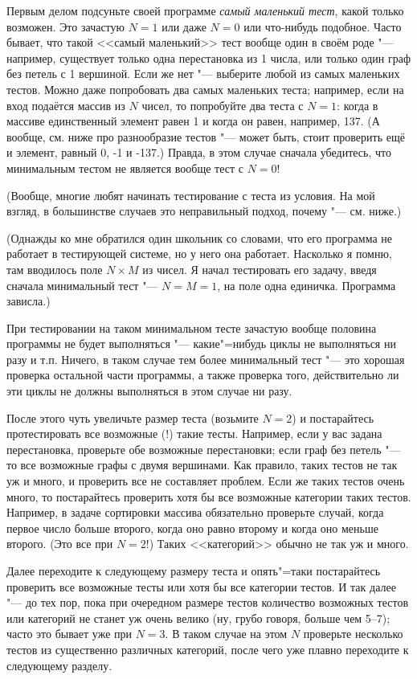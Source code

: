 \documentclass[a4paper,10pt]{problems}
\begin{document}
Первым делом подсуньте своей программе \textit{самый маленький тест}, какой только возможен. Это зачастую $N=1$ или даже $N=0$ или что-нибудь подобное. Часто бывает, что такой <<самый маленький>> тест вообще один в своём роде "--- например, существует только одна перестановка из 1 числа, или только один граф без петель с 1 вершиной. Если же нет "--- выберите любой из самых маленьких тестов. Можно даже попробовать два самых маленьких теста; например, если на вход подаётся массив из $N$ чисел, то попробуйте два теста с $N=1$: когда в массиве единственный элемент равен 1 и когда он равен, например, 137. (А вообще, см. ниже про разнообразие тестов "--- может быть, стоит проверить ещё и элемент, равный 0, -1 и -137.) Правда, в этом случае сначала убедитесь, что минимальным тестом не является вообще тест с $N=0$!

(Вообще, многие любят начинать тестирование с теста из условия. На мой взгляд, в большинстве случаев это неправильный подход, почему "--- см. ниже.)

(Однажды ко мне обратился один школьник со словами, что его программа не работает в тестирующей системе, но у него она работает.
Насколько я помню, там вводилось поле $N\times M$ из чисел. 
Я начал тестировать его задачу, введя сначала минимальный тест "--- $N=M=1$, на поле одна единичка. 
Программа зависла.)

При тестировании на таком минимальном тесте зачастую вообще половина программы не будет выполняться "--- какие"=нибудь циклы не выполняться ни разу и т.п.
Ничего, в таком случае тем более минимальный тест "--- это хорошая проверка остальной части программы,
а также проверка того, действительно ли эти циклы не должны выполняться в этом случае ни разу.

После этого чуть увеличьте размер теста (возьмите $N=2$) и постарайтесь протестировать все возможные (!) такие тесты. 
Например, если у вас задана перестановка, проверьте обе возможные перестановки; если граф без петель "--- то все возможные графы с двумя вершинами. 
Как правило, таких тестов не так уж и много, и проверить все не составляет проблем. 
Если же таких тестов очень много, то постарайтесь проверить хотя бы все возможные категории таких тестов. 
Например, в задаче сортировки массива обязательно проверьте случай, когда первое число больше второго, когда оно равно второму и когда оно меньше второго. 
(Это все при $N=2$!) Таких <<категорий>> обычно не так уж и много.

Далее переходите к следующему размеру теста и опять"=таки постарайтесь проверить все возможные тесты или хотя бы все категории тестов. И так далее "--- до тех пор, пока при очередном размере тестов количество возможных тестов или категорий не станет уж очень велико (ну, грубо говоря, больше чем 5--7); часто это бывает уже при $N=3$. В таком случае на этом $N$ проверьте несколько тестов из существенно различных категорий, после чего уже плавно переходите к следующему разделу.
\end{document}
